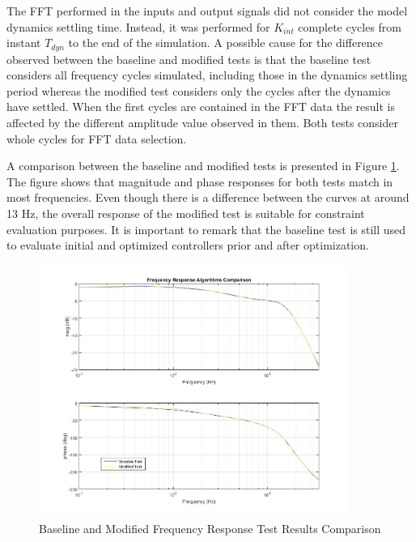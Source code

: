 The FFT performed in the inputs and output signals did not consider the model dynamics settling time. Instead, it was performed for $K_{int}$ complete cycles from instant $T_{dyn}$ to the end of the simulation. A possible cause for the difference observed between the baseline and modified tests is that the baseline test considers all frequency cycles simulated, including those in the dynamics settling period whereas the modified test considers only the cycles after the dynamics have settled. When the first cycles are contained in the FFT data the result is affected by the different amplitude value observed in them. Both tests consider whole cycles for FFT data selection.

A comparison between the baseline and modified tests is presented in Figure \ref{fig:4_3_2_4_ModifiedBaselineScriptResults}. The figure shows that magnitude and phase responses for both tests match in most frequencies. Even though there is a difference between the curves at around 13 Hz, the overall response of the modified test is suitable for constraint evaluation purposes. It is important to remark that the baseline test is still used to evaluate initial and optimized controllers prior and after optimization.

\begin{figure}[H]
	\centering
	\centerline{\includegraphics[width=0.9\textwidth]{Figuras/4.DynamicStifinessOptimizationAlgorithm/4-3-2-4-ModifiedBaselineScriptResults.jpg}}
	\caption{Baseline and Modified Frequency Response Test Results Comparison}
	\label{fig:4_3_2_4_ModifiedBaselineScriptResults}
\end{figure}

